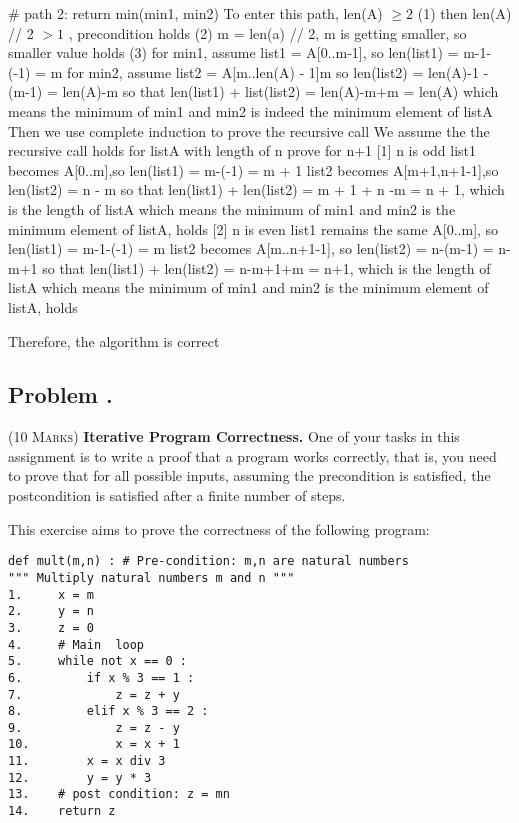 \documentclass[12pt]{article}
\newcounter{ProblemNum}
\renewcommand{\theProblemNum}{\arabic{ProblemNum}}
\newcommand*{\anyproblem}[1]{\newpage\subsection*{#1}}
\newcommand*{\problem}[1]{\stepcounter{ProblemNum} %
\anyproblem{Problem \theProblemNum. \; #1}}
\begin{document}
    # path 2: return min(min1, min2)
    To enter this path, len(A) $\ge 2 $ \vskip5pt
    (1) then len(A) // 2 $> 1$ , precondition holds \vskip5pt
    (2) m = len(a) // 2, m is getting smaller, so smaller value holds \vskip5pt
    (3) for min1, assume list1 = A[0..m-1], so len(list1) = m-1-(-1) = m \vskip5pt
        for min2, assume list2 = A[m..len(A) - 1]m so len(list2) = len(A)-1 - (m-1) = len(A)-m \vskip5pt
        so that len(list1) + list(list2) = len(A)-m+m = len(A)\vskip5pt
        which means the minimum of min1 and min2 is indeed the minimum element of listA\vskip5pt
        Then we use complete induction to prove the recursive call \vskip5pt
        We assume the the recursive call holds for listA with length of n
        prove for n+1\vskip5pt
        [1] n is odd
        list1 becomes A[0..m],so len(list1) = m-(-1) = m + 1\vskip5pt
        list2 becomes A[m+1,n+1-1],so len(list2) = n - m\vskip5pt
        so that len(list1) + len(list2) = m + 1 + n -m = n + 1, which is the length of listA
        which means the minimum of min1 and min2 is the minimum element of listA, holds\vskip5pt
        [2] n is even
        list1 remains the same A[0..m], so len(list1) = m-1-(-1) = m\vskip5pt
        list2 becomes A[m..n+1-1], so len(list2) = n-(m-1) = n-m+1\vskip5pt
        so that len(list1) + len(list2) = n-m+1+m = n+1, which is the length of listA\vskip5pt 
        which means the minimum of min1 and min2 is the minimum element of listA, holds\vskip5pt
        
Therefore, the algorithm is correct
        
        
        
        

\problem{}
\textsc{(10 Marks)} \textbf{Iterative Program Correctness.} One of your tasks in this assignment is to write a proof that a program works correctly, that is,
you need to prove that for all possible inputs, assuming the precondition is satisfied, the postcondition is satisfied after a finite number of steps.


This exercise aims to prove the correctness of the following program:

\begin{small}
\begin{verbatim}
def mult(m,n) : # Pre-condition: m,n are natural numbers
""" Multiply natural numbers m and n """
1.     x = m
2.     y = n
3.     z = 0
4.     # Main  loop 
5.     while not x == 0 :
6.         if x % 3 == 1 : 
7.             z = z + y 
8.         elif x % 3 == 2 : 
9.             z = z - y
10.            x = x + 1
11.        x = x div 3 
12.        y = y * 3
13.    # post condition: z = mn
14.    return z
\end{verbatim}
\end{small}
\end{document}
